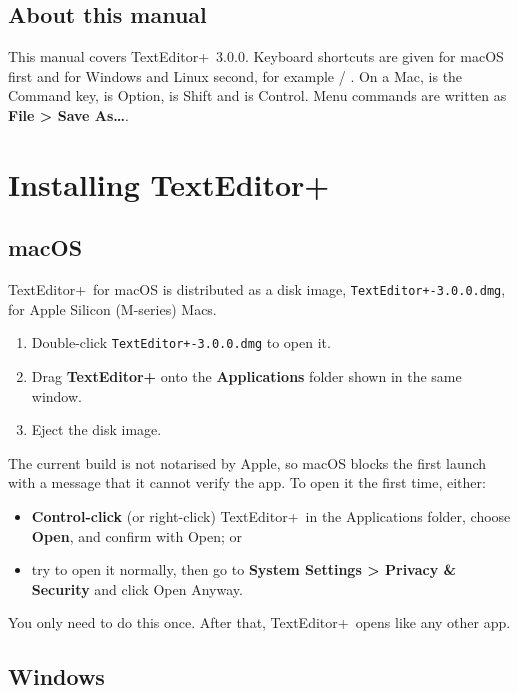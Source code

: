 \documentclass[11pt,a4paper]{article}
\newcommand{\appname}{TextEditor+}
\newcommand{\version}{3.0.0}
\newcommand{\menu}[1]{\textsf{\textbf{#1}}}
\newcommand{\ui}[1]{\textsf{#1}}
\begin{document}
\subsection{About this manual}

This manual covers \appname\ \version. Keyboard shortcuts are given for macOS
first and for Windows and Linux second, for example  / .
On a Mac,  is the Command key,  is Option,  is Shift and
 is Control. Menu commands are written as \menu{File > Save As…}.

\section{Installing \appname}

\subsection{macOS}\label{sec:install-mac}

\appname\ for macOS is distributed as a disk image,
\texttt{TextEditor+-\version.dmg}, for Apple Silicon (M-series) Macs.

\begin{enumerate}
  \item Double-click \texttt{TextEditor+-\version.dmg} to open it.
  \item Drag \textbf{\appname} onto the \textbf{Applications} folder shown in
        the same window.
  \item Eject the disk image.
\end{enumerate}

The current build is not notarised by Apple, so macOS blocks the first launch
with a message that it cannot verify the app. To open it the first time,
either:

\begin{itemize}
  \item \textbf{Control-click} (or right-click) \appname\ in the Applications
        folder, choose \menu{Open}, and confirm with \ui{Open}; or
  \item try to open it normally, then go to \menu{System Settings > Privacy \&
        Security} and click \ui{Open Anyway}.
\end{itemize}

You only need to do this once. After that, \appname\ opens like any other app.

\subsection{Windows}\label{sec:install-windows}
\end{document}
